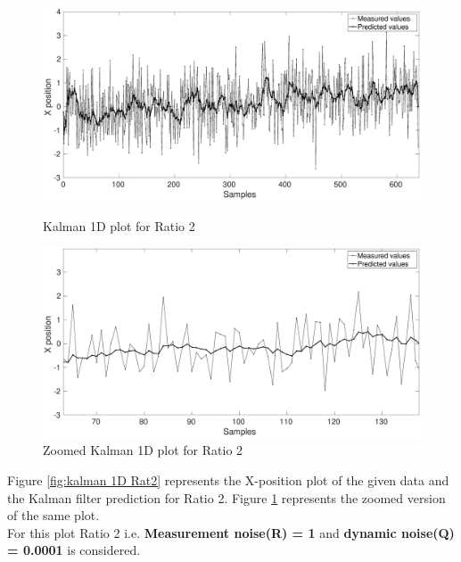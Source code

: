 \documentclass[12pt]{article}
\begin{document}
\newpage
\begin{figure}[h]
\centering
\begin{minipage}{0.5\textwidth}
\centering
	\includegraphics[width = \textwidth]{./Figures/part1Ratio2.eps}
	\caption{Kalman 1D plot for Ratio 2}
	\label{fig:kalman 1D Rat2}
\end{minipage}%
\begin{minipage}{0.5\textwidth}
\centering
	\includegraphics[width = \textwidth]{./Figures/part1Ratio2zoomed.eps}
	\caption{ Zoomed Kalman 1D plot for Ratio 2}
	\label{fig: kalman 1D Rat2 zoom}
\end{minipage}
\end{figure}
\noindent
Figure \ref{fig:kalman 1D Rat2} represents the X-position plot of the given data and the Kalman filter prediction for Ratio 2. Figure \ref{fig: kalman 1D Rat2 zoom} represents the zoomed version of the same plot.\\
For this plot Ratio 2 i.e. \textbf{Measurement noise(R) = 1} and \textbf{dynamic noise(Q) = 0.0001} is considered.\\
\end{document}
